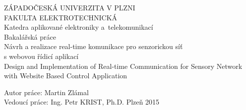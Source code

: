 \documentclass[oneside,12pt,a4paper,draft]{book} %
\begin{document}
\pagestyle{empty}
\begin{titlepage}
\noindent
\begin{center}
	{\LARGE ZÁPADOČESKÁ UNIVERZITA V PLZNI} \\[0.1cm]
	{\LARGE FAKULTA ELEKTROTECHNICKÁ} \\[0.4cm]
	{\Large\sc Katedra aplikované elektroniky a~telekomunikací} \\
	\vspace{5cm}
	{\Huge\sc Bakalářská práce} \\
	\vspace{1cm}
	{\large Návrh a realizace real-time komunikace pro senzorickou síť\\s webovou řídicí aplikací\\}
	\vspace{1cm}
	{\large Design and Implementation of Real-time Communication for Sensory Network with Website Based Control Application}
\end{center}
\vfill
Autor práce: Martin Zlámal\\
Vedoucí práce: Ing. Petr KRIST, Ph.D. \hfill Plzeň 2015
\end{titlepage}

\pagestyle{plain}







\tableofcontents
\cleardoublepage
{}
{}
\listoffigures
\end{document}
